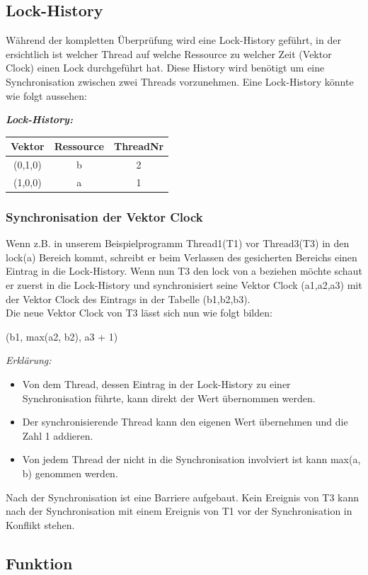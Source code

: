 \documentclass[10pt,a4paper]{article}
\begin{document}
\subsection{Lock-History}
\begin{flushleft}
Während der kompletten Überprüfung wird eine Lock-History geführt, in der ersichtlich ist welcher Thread auf welche Ressource zu welcher Zeit (Vektor Clock) einen Lock durchgeführt hat. Diese History wird benötigt um eine Synchronisation zwischen zwei Threads vorzunehmen. Eine Lock-History könnte wie folgt aussehen:
\end{flushleft}
\begin{center}
\textbf{\textit{Lock-History:}}\\[0.5cm]
\begin{tabular}{ c c c }
  Vektor & Ressource & ThreadNr \\\hline
  (0,1,0) & b & 2 \\
  (1,0,0) & a & 1 \\\hline
\end{tabular}
\end{center}
\subsubsection{Synchronisation der Vektor Clock}
\begin{flushleft}
Wenn z.B. in unserem Beispielprogramm Thread1(T1) vor Thread3(T3) in den lock(a) Bereich kommt, schreibt er beim Verlassen des gesicherten Bereichs einen Eintrag in die Lock-History. Wenn nun T3 den lock von a beziehen möchte schaut er zuerst in die Lock-History und synchronisiert seine Vektor Clock (a1,a2,a3) mit der Vektor Clock des Eintrags in der Tabelle (b1,b2,b3).\\
Die neue Vektor Clock von T3 lässt sich nun wie folgt bilden: 
\begin{center}(b1, max(a2, b2), a3 + 1)\end{center}
\textit{Erklärung:}
\begin{itemize}
\item Von dem Thread, dessen Eintrag in der Lock-History zu einer Synchronisation führte, kann direkt der Wert übernommen werden.
\item Der synchronisierende Thread kann den eigenen Wert übernehmen und die Zahl 1 addieren.
\item Von jedem Thread der nicht in die Synchronisation involviert ist kann max(a, b) genommen werden.
\end{itemize}
Nach der Synchronisation ist eine Barriere aufgebaut. Kein Ereignis von T3 kann nach der Synchronisation mit einem Ereignis von T1 vor der Synchronisation in Konflikt stehen.
\end{flushleft}
\subsection{Funktion}
\begin{flushleft}

\end{flushleft}
\end{document}
